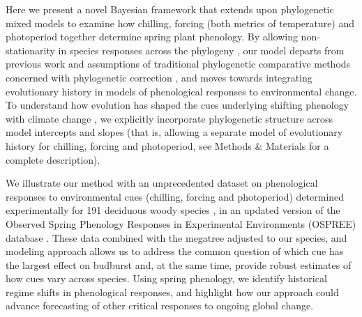 \documentclass[11pt]{article}
\newcommand{\R}[1]{\label{}\linelabel{#1}}
\begin{document}
\R{whatisyourpaper3}Here we present a novel Bayesian framework that extends upon phylogenetic mixed models \citep{housworth2004phylogenetic} to examine how chilling, forcing (both metrics of temperature) and photoperiod together determine spring plant phenology. By allowing non-stationarity in species responses across the phylogeny \citep{davies2019phylogenetically}, our model departs from previous work and assumptions of traditional phylogenetic comparative methods concerned with phylogenetic correction \citep[e.g.,][]{freckleton2002phylogenetic}, and moves towards integrating evolutionary history in models of phenological responses to environmental change. To understand how evolution has shaped the cues underlying shifting phenology with climate change \citep{uyeda2017evolution}, we explicitly incorporate phylogenetic structure across model intercepts and slopes (that is, allowing a separate model of evolutionary history for chilling, forcing and photoperiod, see Methods \& Materials for a complete description). 

We illustrate our method with an unprecedented dataset on phenological responses to environmental cues (chilling, forcing and photoperiod) determined experimentally for 191 deciduous woody \R{whatisyourpaper3end}species \cite[by far the most studied group of species in phenology experiments, see][]{ettinger2020}, in an updated version of the Observed Spring Phenology Responses in Experimental Environments (OSPREE) database \citep{wolkovich2019}. These data combined with the \citet{smith2018constructing} megatree adjusted to our species, and modeling approach allows us to address the common question of which cue has the largest effect on budburst and, at the same time, provide robust estimates of how cues vary across species. Using spring phenology, we identify historical regime shifts \citep{uyeda2017evolution} in phenological responses, and highlight how our approach could advance forecasting of other critical responses to ongoing global change.



\end{document}
